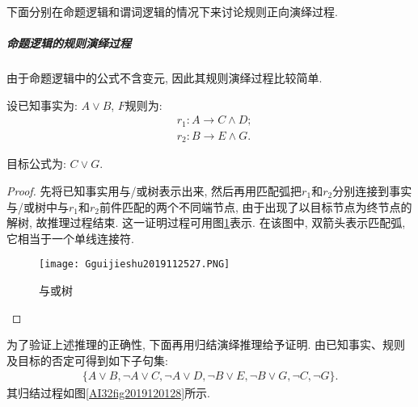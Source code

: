 下面分别在命题逻辑和谓词逻辑的情况下来讨论规则正向演绎过程.
\subparagraph{命题逻辑的规则演绎过程}
    由于命题逻辑中的公式不含变元, 因此其规则演绎过程比较简单.
\begin{example}
    设已知事实为: $A\vee B$, $F$规则为:
\begin{align}
    &r_1:  A\rightarrow C\wedge D;\\
    &r_2:  B\rightarrow E\wedge G.
\end{align}

目标公式为: $C\vee G$.
\end{example}
\begin{proof}
    先将已知事实用与/或树表示出来, 然后再用匹配弧把$r_1$和$r_2$分别连接到事实与/或树中与$r_1$和$r_2$前件匹配的两个不同端节点, 由于出现了以目标节点为终节点的解树, 故推理过程结束. 这一证明过程可用图\ref{AI32fig2019120127}表示.
在该图中, 双箭头表示匹配弧, 它相当于一个单线连接符.
\begin{figure}[H]
    \centering
    \texttt{[image: Gguijieshu2019112527.PNG]}
    \caption{与或树}
    \label{AI32fig2019120127}
\end{figure}
\end{proof}
为了验证上述推理的正确性, 下面再用归结演绎推理给予证明. 由已知事实、规则及目标的否定可得到如下子句集:
\begin{align}
    \{A\vee B, \neg A\vee C, \neg A\vee D, \neg B\vee E, \neg B\vee G, \neg C, \neg G\}.
\end{align}
其归结过程如图\ref{AI32fig2019120128}所示.

